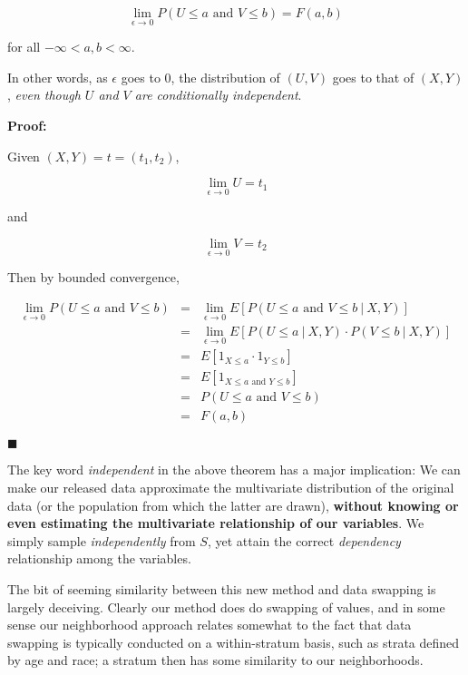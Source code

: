\documentclass[11pt]{article}
\begin{document}
\begin{equation}
\lim_{\epsilon \rightarrow 0}
P
\left (
U \leq a \textrm{ and } V \leq b
\right )
= F(a,b)
\end{equation}

for all $-\infty < a,b < \infty$.  

In other words, as $\epsilon$ goes to 0, the distribution of $(U,V)$
goes to that of $(X,Y)$, {\it even though $U$ and $V$ are conditionally
independent}.

{\bf Proof:}

Given $(X,Y) = t = (t_1,t_2)$,

\begin{equation}
\lim_{\epsilon \rightarrow 0} U = t_1
\end{equation}

and

\begin{equation}
\lim_{\epsilon \rightarrow 0} V = t_2
\end{equation}


Then by bounded convergence,

\begin{eqnarray}
\lim_{\epsilon \rightarrow 0}
P
\left (
U \leq a \textrm{ and } V \leq b
\right )
&=& 
\lim_{\epsilon \rightarrow 0}
E \left [
P
\left (
U \leq a \textrm{ and } V \leq b
~|~ X,Y \right )
\right ] \\ 
&=& 
\lim_{\epsilon \rightarrow 0}
E \left [
P(U \leq a ~|~ X,Y ) \cdot
P(V \leq b ~|~ X,Y ) 
\right ] \\
&=& E \left [
1_{X \leq a} \cdot
1_{Y \leq b}
\right ] \\
&=& E \left [
1_{X \leq a \textrm{ and } Y \leq b}
\right ] \\
&=& P(U \leq a \textrm{ and } V \leq b) \\
&=& F(a,b)
\end{eqnarray}

$\blacksquare$

\bigskip

The key word {\it independent} in the above theorem has a major
implication:  We can make our released data approximate the multivariate
distribution of the original data (or the population from which the
latter are drawn), {\bf without knowing or even estimating the
multivariate relationship of our variables}.  We simply sample {\it
independently} from $S$, yet attain the correct {\it dependency}
relationship among the variables.

The bit of seeming similarity between this new method and data swapping
is largely deceiving.  Clearly our method does do swapping of values,
and in some sense our neighborhood approach relates somewhat to the fact
that data swapping is typically conducted on a within-stratum basis,
such as strata defined by age and race; a stratum then has some
similarity to our neighborhoods. 
\end{document}
